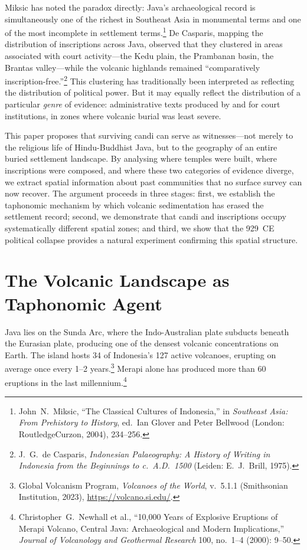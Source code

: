 \documentclass[12pt,a4paper]{article}
\begin{document}
Miksic has noted the paradox directly: Java's archaeological record is simultaneously one of the richest in Southeast Asia in monumental terms and one of the most incomplete in settlement terms.\footnote{John~N.\ Miksic, ``The Classical Cultures of Indonesia,'' in \emph{Southeast Asia: From Prehistory to History}, ed.\ Ian Glover and Peter Bellwood (London: RoutledgeCurzon, 2004), 234--256.}
De Casparis, mapping the distribution of inscriptions across Java, observed that they clustered in areas associated with court activity---the Kedu plain, the Prambanan basin, the Brantas valley---while the volcanic highlands remained ``comparatively inscription-free.''\footnote{J.~G.\ de Casparis, \emph{Indonesian Palaeography: A History of Writing in Indonesia from the Beginnings to c.~A.D.~1500} (Leiden: E.~J.\ Brill, 1975).}
This clustering has traditionally been interpreted as reflecting the distribution of political power.
But it may equally reflect the distribution of a particular \emph{genre} of evidence: administrative texts produced by and for court institutions, in zones where volcanic burial was least severe.

This paper proposes that surviving candi can serve as witnesses---not merely to the religious life of Hindu-Buddhist Java, but to the geography of an entire buried settlement landscape.
By analysing where temples were built, where inscriptions were composed, and where these two categories of evidence diverge, we extract spatial information about past communities that no surface survey can now recover.
The argument proceeds in three stages: first, we establish the taphonomic mechanism by which volcanic sedimentation has erased the settlement record; second, we demonstrate that candi and inscriptions occupy systematically different spatial zones; and third, we show that the 929~CE political collapse provides a natural experiment confirming this spatial structure.

\section{The Volcanic Landscape as Taphonomic Agent}

Java lies on the Sunda Arc, where the Indo-Australian plate subducts beneath the Eurasian plate, producing one of the densest volcanic concentrations on Earth.
The island hosts 34 of Indonesia's 127 active volcanoes, erupting on average once every 1--2 years.\footnote{Global Volcanism Program, \emph{Volcanoes of the World}, v.~5.1.1 (Smithsonian Institution, 2023), \url{https://volcano.si.edu/}.}
Merapi alone has produced more than 60 eruptions in the last millennium.\footnote{Christopher~G.\ Newhall et al., ``10,000 Years of Explosive Eruptions of Merapi Volcano, Central Java: Archaeological and Modern Implications,'' \emph{Journal of Volcanology and Geothermal Research} 100, no.~1--4 (2000): 9--50.}
\end{document}
